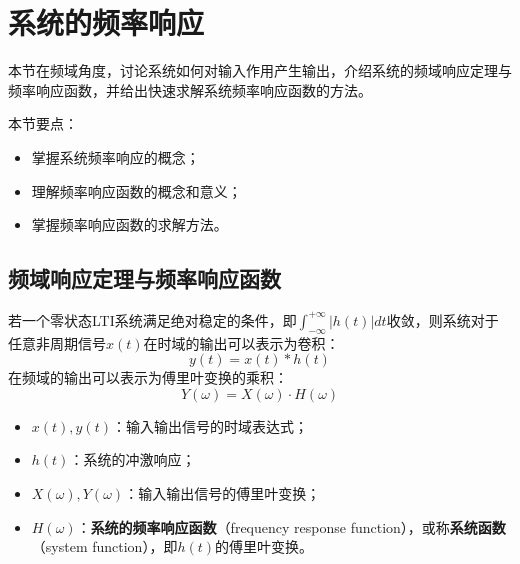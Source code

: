 \section{系统的频率响应}

本节在频域角度，讨论系统如何对输入作用产生输出，介绍系统的频域响应定理与频率响应函数，并给出快速求解系统频率响应函数的方法。

本节要点：
\begin{itemize}
    \item 掌握系统频率响应的概念；
    \item 理解频率响应函数的概念和意义；
    \item 掌握频率响应函数的求解方法。
\end{itemize}

\subsection{频域响应定理与频率响应函数}

\begin{theorem}[系统的频域响应定理]
若一个零状态LTI系统满足绝对稳定的条件，即$\int_{-\infty}^{+\infty}{\left| h\left( t \right) \right|dt}$收敛，则系统对于任意非周期信号$x\left( t \right) $在时域的输出可以表示为卷积：
\[
y\left( t \right) =x\left( t \right) \ast h\left( t \right)
\]
在频域的输出可以表示为傅里叶变换的乘积：
\[
Y\left( \omega \right) =X\left( \omega \right) \cdot H\left( \omega \right)
\]
\begin{itemize}
    \item $x\left( t \right) ,y\left( t \right) $：输入输出信号的时域表达式；
    \item $h\left( t \right) $：系统的冲激响应；
    \item $X\left( \omega \right) ,Y\left( \omega \right) $：输入输出信号的傅里叶变换；
    \item $H\left( \omega \right) $：{\bf 系统的频率响应函数}（frequency response function），或称{\bf 系统函数}（system function），即$h\left( t \right) $的傅里叶变换。
\end{itemize}
\end{theorem}


